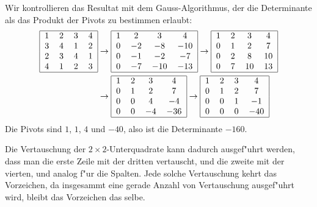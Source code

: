 \begin{loesung}
\begin{teilaufgaben}
Wir kontrollieren das Resultat mit dem Gauss-Algorithmus, der
die Determinante als das Produkt der Pivots zu bestimmen erlaubt:
\begin{align*}
\begin{tabular}{|cccc|}
\hline
1&2&3&4\\
3&4&1&2\\
2&3&4&1\\
4&1&2&3\\
\hline
\end{tabular}
&
\rightarrow
\begin{tabular}{|cccc|}
\hline
1&2&3&4\\
0&$-2$&$-8$&$-10$\\
0&$-1$&$-2$&$-7$\\
0&$-7$&$-10$&$-13$\\
\hline
\end{tabular}
\rightarrow
\begin{tabular}{|cccc|}
\hline
1&2&3&4\\
0&$1$&$2$&$7$\\
0&$2$&$8$&$10$\\
0&$7$&$10$&$13$\\
\hline
\end{tabular}
\\
&
\rightarrow
\begin{tabular}{|cccc|}
\hline
1&2&3&4\\
0&$1$&$2$&$7$\\
0&$0$&$4$&$-4$\\
0&$0$&$-4$&$-36$\\
\hline
\end{tabular}
\rightarrow
\begin{tabular}{|cccc|}
\hline
1&2&3&4\\
0&$1$&$2$&$7$\\
0&$0$&$1$&$-1$\\
0&$0$&$0$&$-40$\\
\hline
\end{tabular}
\end{align*}
Die Pivots sind $1$, $1$, $4$ und $-40$, also ist die Determinante $-160$.

\item Die Vertauschung der $2\times 2$-Unterquadrate kann dadurch
ausgef"uhrt werden, dass man die erste Zeile mit der dritten vertauscht,
und die zweite mit der vierten, und analog f"ur die Spalten. Jede
solche Vertauschung kehrt das Vorzeichen, da insgesammt eine gerade
Anzahl von Vertauschung ausgef"uhrt wird, bleibt das Vorzeichen das
selbe.
\end{teilaufgaben}
\end{loesung}
